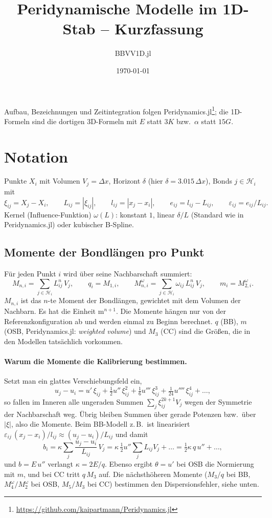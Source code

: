 \documentclass[a4paper,11pt]{article}
\title{Peridynamische Modelle im 1D-Stab -- Kurzfassung}
\author{BBVV1D.jl}
\date{\today}
\begin{document}
\maketitle

Aufbau, Bezeichnungen und Zeitintegration folgen
Peridynamics.jl\footnote{\url{https://github.com/kaipartmann/Peridynamics.jl}}; die 1D-Formeln sind die dortigen 3D-Formeln
mit $E$ statt $3K$ bzw.\ $\alpha$ statt $15G$.

\section*{Notation}
Punkte $X_i$ mit Volumen $V_j=\Delta x$, Horizont $\delta$ (hier $\delta = 3.015\,\Delta x$), Bonds $j\in\mathcal H_i$ mit
\[
  \xi_{ij} = X_j - X_i,\qquad L_{ij} = |\xi_{ij}|,\qquad l_{ij} = |x_j - x_i|,\qquad
  e_{ij} = l_{ij} - L_{ij},\qquad \varepsilon_{ij} = e_{ij}/L_{ij}.
\]
Kernel (Influence-Funktion) $\omega(L)$: konstant $1$, linear $\delta/L$ (Standard wie in Peridynamics.jl)
oder kubischer B-Spline.

\subsection*{Momente der Bondlängen pro Punkt}
Für jeden Punkt $i$ wird über seine Nachbarschaft summiert:
\[
  M_{n,i} = \sum_{j\in\mathcal H_i} L_{ij}^n\,V_j,\qquad q_i = M_{1,i},\qquad
  M^\omega_{n,i} = \sum_{j\in\mathcal H_i} \omega_{ij}\,L_{ij}^n\,V_j,\qquad m_i = M^\omega_{2,i} .
\]
$M_{n,i}$ ist das $n$-te Moment der Bondlängen, gewichtet mit dem Volumen der Nachbarn. Es hat die Einheit
$\mathrm{m}^{n+1}$. Die Momente hängen nur von der Referenzkonfiguration ab und werden einmal zu Beginn berechnet.
$q$ (BB), $m$ (OSB, Peridynamics.jl: \emph{weighted volume}) und $M_3$ (CC) sind die Größen, die in den Modellen tatsächlich vorkommen.

\paragraph{Warum die Momente die Kalibrierung bestimmen.} Setzt man ein glattes Verschiebungsfeld ein,
\[
  u_j - u_i = u'\,\xi_{ij} + \tfrac12 u''\,\xi_{ij}^2 + \tfrac16 u'''\,\xi_{ij}^3 + \tfrac1{24}u''''\,\xi_{ij}^4 + \dots,
\]
so fallen im Inneren alle ungeraden Summen $\sum_j \xi_{ij}^{2k+1} V_j$ wegen der Symmetrie der Nachbarschaft weg. Übrig bleiben Summen
über gerade Potenzen bzw.\ über $|\xi|$, also die Momente. Beim BB-Modell z.\,B.\ ist linearisiert
$\varepsilon_{ij}\,(x_j-x_i)/l_{ij} \approx (u_j-u_i)/L_{ij}$ und damit
\[
  b_i = \kappa\sum_j \frac{u_j-u_i}{L_{ij}}\,V_j
      = \kappa\,\tfrac12 u''\sum_j L_{ij} V_j + \dots = \tfrac12\kappa\,q\,u'' + \dots ,
\]
und $b = E\,u''$ verlangt $\kappa = 2E/q$. Ebenso ergibt $\theta = u'$ bei OSB die Normierung mit $m$, und bei CC
tritt $q\,M_3$ auf. Die nächsthöheren Momente ($M_3/q$ bei BB, $M^\omega_4/M^\omega_2$ bei OSB, $M_5/M_3$ bei CC)
bestimmen den Dispersionsfehler, siehe unten.
\end{document}
